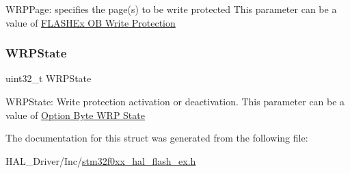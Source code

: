W\+R\+P\+Page\+: specifies the page(s) to be write protected This parameter can be a value of \hyperlink{group___f_l_a_s_h_ex___o_b___write___protection}{F\+L\+A\+S\+H\+Ex OB Write Protection} \mbox{\label{struct_f_l_a_s_h___o_b_program_init_type_def_ab5ab320199482e9eb21dc8460501dea5}} 
\subsubsection{\texorpdfstring{W\+R\+P\+State}{WRPState}}
{\footnotesize\ttfamily uint32\+\_\+t W\+R\+P\+State}

W\+R\+P\+State\+: Write protection activation or deactivation. This parameter can be a value of \hyperlink{group___f_l_a_s_h_ex___o_b___w_r_p___state}{Option Byte W\+RP State} 

The documentation for this struct was generated from the following file\+:\begin{DoxyCompactItemize}
\item 
H\+A\+L\+\_\+\+Driver/\+Inc/\hyperlink{stm32f0xx__hal__flash__ex_8h}{stm32f0xx\+\_\+hal\+\_\+flash\+\_\+ex.\+h}\end{DoxyCompactItemize}
